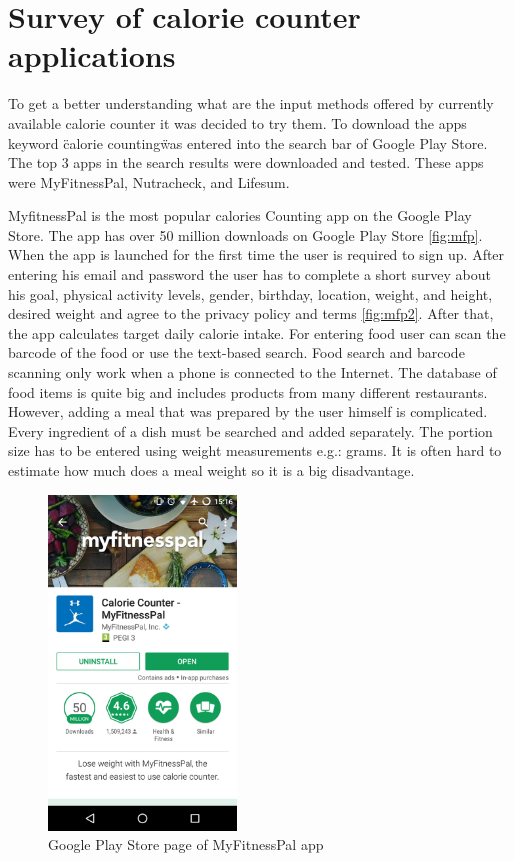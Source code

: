 \section{Survey of calorie counter applications}

To get a better understanding what are the input methods offered by currently available calorie counter it was decided to try them. To download the apps keyword \"calorie counting\" was entered into the search bar of Google Play Store. The top 3 apps in the search results were downloaded and tested. These apps were MyFitnessPal, Nutracheck, and Lifesum.

MyfitnessPal is the most popular calories Counting app on the Google Play Store. The app has over 50 million downloads on Google Play Store \autoref{fig:mfp}. When the app is launched for the first time the user is required to sign up. After entering his email and password the user has to complete a short survey about his goal, physical activity levels, gender, birthday, location, weight, and height, desired weight and agree to the privacy policy and terms \autoref{fig:mfp2}. After that, the app calculates target daily calorie intake. For entering food user can scan the barcode of the food or use the text-based search. Food search and barcode scanning only work when a phone is connected to the Internet.  The database of food items is quite big and includes products from many different restaurants. However,  adding a meal that was prepared by the user himself is complicated. Every ingredient of a dish must be searched and added separately.  The portion size has to be entered using weight measurements e.g.:  grams. It is often hard to estimate how much does a meal weight so it is a big disadvantage.
 
\begin{figure}[ht]
\centering
\includegraphics[width=5cm,scale=0.5]{Figures/2/mfp1.png}
\caption{Google Play Store page of MyFitnessPal app}
\label{fig:mfp}
\end{figure}

